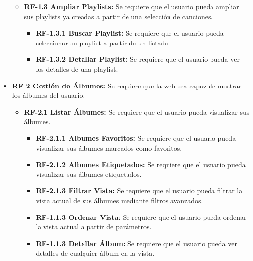 \begin{itemize}
\begin{itemize}
            \item
                \textbf{RF-1.3 Ampliar Playlists:} Se requiere que el usuario pueda ampliar sus playlists ya creadas a partir de una selección de canciones.
                \begin{itemize}
                    \item
                        \textbf{RF-1.3.1 Buscar Playlist:} Se requiere que el usuario pueda seleccionar su playlist a partir de un listado.
                    \item
                        \textbf{RF-1.3.2 Detallar Playlist:} Se requiere que el usuario pueda ver los detalles de una playlist.
                \end{itemize}
        \end{itemize}
    

        
    \item  
        \textbf{RF-2 Gestión de Álbumes:} Se requiere que la web sea capaz de mostrar los álbumes del usuario.
        \begin{itemize}
            \item 
                \textbf{RF-2.1 Listar Álbumes:} Se requiere que el usuario pueda visualizar sus álbumes.
                \begin{itemize}
                    \item 
                        \textbf{RF-2.1.1 Albumes Favoritos:} Se requiere que el usuario pueda visualizar sus álbumes marcados como favoritos.
                    \item 
                        \textbf{RF-2.1.2 Albumes Etiquetados:} Se requiere que el usuario pueda visualizar sus álbumes etiquetados.
                        
                    \item
                        \textbf{RF-2.1.3 Filtrar Vista:} Se requiere que el usuario pueda filtrar la vista actual de sus álbumes mediante filtros avanzados.
                    \item
                        \textbf{RF-1.1.3 Ordenar Vista:} Se requiere que el usuario pueda ordenar la vista actual a partir de parámetros.
                    \item
                        \textbf{RF-1.1.3 Detallar Álbum:} Se requiere que el usuario pueda ver detalles de cualquier álbum en la vista. 
                \end{itemize}
                

\end{itemize}
\end{itemize}
